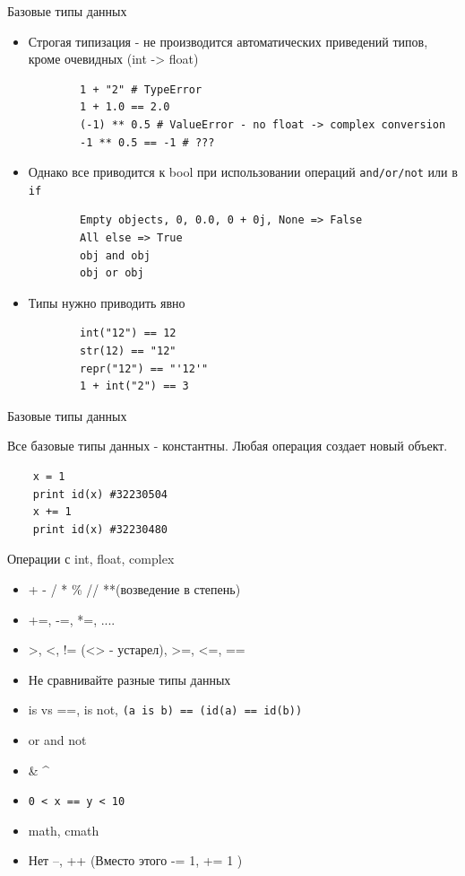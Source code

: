 \documentclass{article}
\begin{document}
\begin{center} Базовые типы данных \end{center}
\begin{itemize}
	\item Строгая типизация - не производится автоматических приведений типов, кроме очевидных (int -> float)
	\vspace{15pt}
	\begin{lstlisting}
		1 + "2" # TypeError
		1 + 1.0 == 2.0
		(-1) ** 0.5 # ValueError - no float -> complex conversion
		-1 ** 0.5 == -1 # ??? 
	\end{lstlisting}

	\item Однако все приводится к bool при использовании операций \lstinline|and/or/not| или в 
	        \lstinline|if|
	\begin{lstlisting}
		Empty objects, 0, 0.0, 0 + 0j, None => False
		All else => True
		obj and obj
		obj or obj
	\end{lstlisting}

	\item Типы нужно приводить явно
	\vspace{15pt}
	\begin{lstlisting}
		int("12") == 12
		str(12) == "12"
		repr("12") == "'12'"
		1 + int("2") == 3
	\end{lstlisting}
\end{itemize}
\newpage

\begin{center} Базовые типы данных \end{center}
Все базовые типы данных - константны. Любая операция создает новый объект.
\begin{lstlisting}
    x = 1
    print id(x) #32230504
    x += 1
    print id(x) #32230480
\end{lstlisting}
\newpage

\begin{center} Операции с int,  float, complex \end{center}
\begin{itemize}
	\item + - / * \% // **(возведение в степень)
	\item +=, -=, *=, ....
	\item >, <, != (<> - устарел), >=, <=, == 
	\item Не сравнивайте разные типы данных
	\item is vs ==, is not, \lstinline!(a is b) == (id(a) == id(b))!
	\item or and not
	\item \& \hspace{10pt} \textbar \hspace{10pt} \textasciicircum
	\item \lstinline!0 < x == y < 10!
	\item math, cmath
	\item Нет --, ++ (Вместо этого -= 1, += 1 )
\end{itemize}
\newpage
\end{document}
